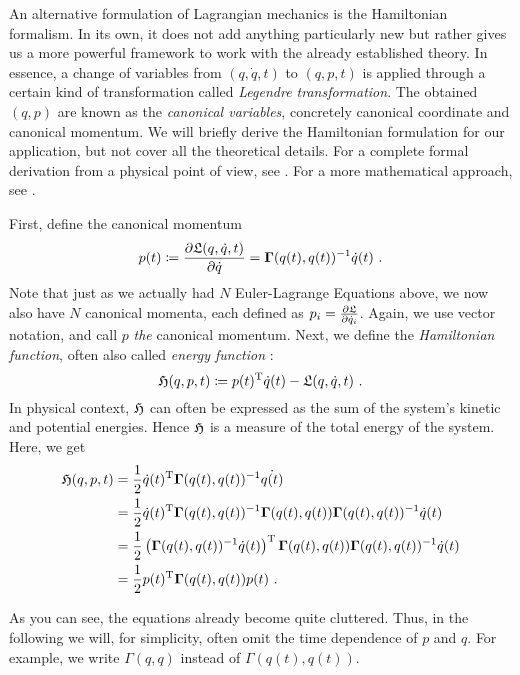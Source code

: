 An alternative formulation of Lagrangian mechanics is the Hamiltonian formalism.
In its own, it does not add anything particularly new but rather gives us a more powerful framework to work with the already established theory.
In essence, a change of variables from $(q, \dot{q}, t)$ to $(q, p, t)$ is applied through a certain kind of transformation called \emph{Legendre transformation}.
The obtained $(q, p)$ are known as the \emph{canonical variables}, concretely canonical coordinate and canonical momentum.
We will briefly derive the Hamiltonian formulation for our application, but not cover all the theoretical details.
For a complete formal derivation from a physical point of view, see \cite[Chapter~8]{goldstein01}.
For a more mathematical approach, see \cite[Chapter~2]{marsden10}.

First, define the canonical momentum
\begin{equation}
\label{eq:canonical-momentum}
	p(t) \coloneqq \frac{\partial \mathfrak{L}(q, \dot{q}, t)}{\partial \dot{q}} = \mathbf{\Gamma}(q(t), q(t))^{-1} \dot{q}(t) \ .
\end{equation}
Note that just as we actually had $N$ Euler-Lagrange Equations above, we now also have $N$ canonical momenta, each defined as $p_i = \frac{\partial \mathfrak{L}}{\partial \dot{q}_i}$.
Again, we use vector notation, and call $p$ \emph{the} canonical momentum.
Next, we define the \emph{Hamiltonian function}, often also called \emph{energy function} \cite{marsden10}:
\begin{equation}
	\mathfrak{H}(q, p, t) \coloneqq p(t)^\mathrm{T}\dot{q}(t) - \mathfrak{L}(q, \dot{q}, t) \ .
\end{equation}
In physical context, $\mathfrak{H}$ can often be expressed as the sum of the system's kinetic and potential energies.
Hence $\mathfrak{H}$ is a measure of the total energy of the system.
Here, we get
\begin{align}
	\mathfrak{H}(q, p, t) &= \frac{1}{2} \dot{q}(t)^{\mathrm{T}} \mathbf{\Gamma}(q(t), q(t))^{-1} \dot{q(t)} \\
	&= \frac{1}{2} \dot{q}(t)^{\mathrm{T}} \mathbf{\Gamma}(q(t), q(t))^{-1} \mathbf{\Gamma}(q(t), q(t)) \mathbf{\Gamma}(q(t), q(t))^{-1} \dot{q}(t)\\
	&= \frac{1}{2}  \left(\mathbf{\Gamma}(q(t), q(t))^{-1} \dot{q}(t)\right)^{\mathrm{T}} \mathbf{\Gamma}(q(t), q(t)) \mathbf{\Gamma}(q(t), q(t))^{-1} \dot{q}(t)\\
	&= \frac{1}{2} p(t)^{\mathrm{T}} \mathbf{\Gamma}(q(t), q(t)) p(t) \ .
\end{align}

As you can see, the equations already become quite cluttered.
Thus, in the following we will, for simplicity, often omit the time dependence of $p$ and $q$.
For example, we write $\Gamma(q, q)$ instead of $\Gamma(q(t), q(t))$.

